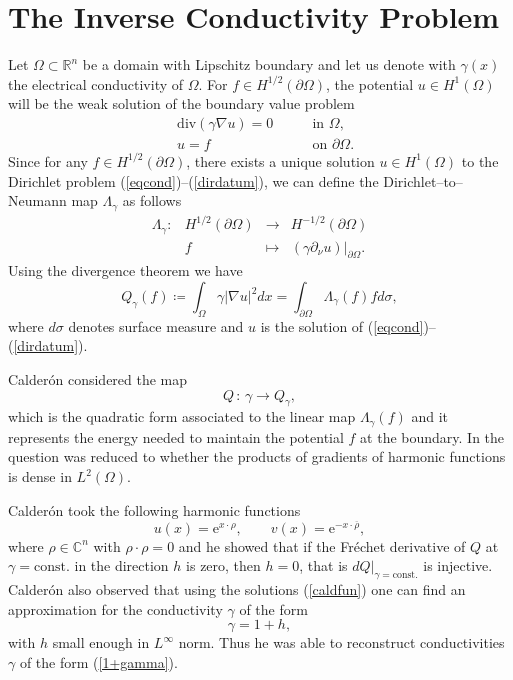 \documentclass[10pt, a4paper, twoside, openright]{book}
\theoremstyle{definition}
\theoremstyle{plain}
\theoremstyle{plain}
\theoremstyle{plain}
\theoremstyle{plain}
\theoremstyle{plain}
\theoremstyle{plain}
\theoremstyle{plain}
\theoremstyle{plain}
\begin{document}
\section{The Inverse Conductivity Problem}
\label{globuniq}
Let $\Omega\subset\mathbb{R}^{n}$ be a domain with Lipschitz boundary and let
us denote with $\gamma(x)$ the electrical conductivity of $\Omega$.
For $f\in H^{1/2}(\partial\Omega)$,
the potential $u\in H^{1}(\Omega)$ will be the weak
solution of the boundary value problem
\begin{eqnarray}
\label{eqcond}  
&\mathrm{div}(\gamma\nabla u)=0\qquad&\textrm{in }\Omega,\\
\label{dirdatum}
&u=f\qquad&\textrm{on }\partial\Omega.
\end{eqnarray}
Since for any $f\in H^{1/2}(\partial\Omega)$, there exists a unique solution $u\in H^{1}(\Omega)$
to the Dirichlet problem (\ref{eqcond})--(\ref{dirdatum}),
we can define the Dirichlet--to--Neumann map $\Lambda_{\gamma}$ as follows
\begin{equation}
\label{dirtoneum}
\begin{array}{crcl}
\Lambda_{\gamma}:&H^{1/2}(\partial\Omega)&\longrightarrow&H^{-1/2}(\partial\Omega)\\
&f&\longmapsto&\left(\gamma\partial_\nu u\right)|_{\partial\Omega}.
\end{array}
\end{equation}
Using the divergence theorem we have
\begin{equation}
\label{Qmap}
Q_{\gamma}(f)\coloneqq\int_{\Omega}\gamma|\nabla u|^{2}dx
=\int_{\partial\Omega}\Lambda_\gamma(f)fd\sigma,
\end{equation}
where $d\sigma$ denotes surface measure and $u$ is the solution
of (\ref{eqcond})--(\ref{dirdatum}).

Calder\'on considered the map
\begin{equation}
\label{Q}
Q\,:\,\gamma\longrightarrow Q_{\gamma},
\end{equation}
which is the quadratic form associated to the linear map
$\Lambda_{\gamma}(f)$ and it represents
the energy needed to maintain the potential
$f$ at the boundary.
In \cite{Ca} the question was reduced to whether the products of gradients
of harmonic functions is dense in $L^{2}(\Omega)$.

Calder\'on
took the following harmonic functions
\begin{equation}
\label{caldfun}
u(x)=\mathrm{e}^{x\cdot\rho},\qquad v(x)=\mathrm{e}^{-x\cdot\overline{\rho}},
\end{equation}
where $\rho\in\mathbb{C}^{n}$ with $\rho\cdot\rho=0$ and he
showed that if the Fr\'echet derivative of $Q$
at $\gamma=\mathrm{const.}$ in the direction $h$ is zero,
then $h=0$, that is $dQ|_{\gamma=\mathrm{const.}}$ is injective.
Calder\'on also observed that using the solutions (\ref{caldfun})
one can find an approximation for the conductivity $\gamma$ of the form
\begin{equation}
\label{1+gamma}
\gamma=1+h,
\end{equation}
with $h$ small enough in $L^{\infty}$ norm.
Thus he was able to reconstruct conductivities $\gamma$ of the form (\ref{1+gamma}).
\end{document}
